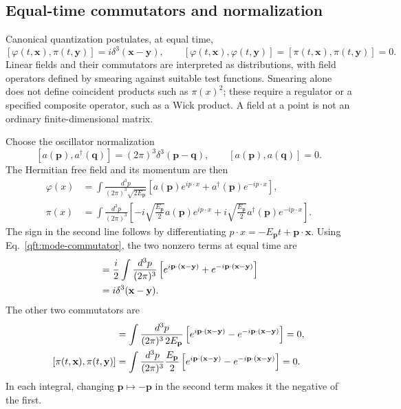 \subsection{Equal-time commutators and normalization}
Canonical quantization postulates, at equal time,
\begin{equation}\label{qft:canonical-commutators}
 [\varphi(t,\mathbf x),\pi(t,\mathbf y)]
 =i\delta^3(\mathbf x-\mathbf y),\qquad
 [\varphi(t,\mathbf x),\varphi(t,\mathbf y)]
 =[\pi(t,\mathbf x),\pi(t,\mathbf y)]=0.
\end{equation}
Linear fields and their commutators are interpreted as distributions,
with field operators defined by smearing against suitable test functions.
Smearing alone does not define coincident products such as $\pi(x)^2$;
these require a regulator or a specified composite operator, such as a Wick
product. A field at a point is not an ordinary finite-dimensional matrix.

Choose the oscillator normalization
\begin{equation}\label{qft:mode-commutator}
 [a(\mathbf p),a^\dagger(\mathbf q)]
 =(2\pi)^3\delta^3(\mathbf p-\mathbf q),\qquad
 [a(\mathbf p),a(\mathbf q)]=0.
\end{equation}
The Hermitian free field and its momentum are then
\begin{align}
 \varphi(x)
 &=\int\frac{d^3p}{(2\pi)^3\sqrt{2E_{\mathbf p}}}
 \left[a(\mathbf p)e^{ip\cdot x}
       +a^\dagger(\mathbf p)e^{-ip\cdot x}\right],
 \label{qft:field-modes}\\
 \pi(x)
 &=\int\frac{d^3p}{(2\pi)^3}
 \left[-i\sqrt{\frac{E_{\mathbf p}}2}a(\mathbf p)e^{ip\cdot x}
       +i\sqrt{\frac{E_{\mathbf p}}2}a^\dagger(\mathbf p)e^{-ip\cdot x}\right].
 \label{qft:momentum-modes}
\end{align}
The sign in the second line follows by differentiating
$p\cdot x=-E_{\mathbf p}t+\mathbf p\cdot\mathbf x$.
Using Eq.~\eqref{qft:mode-commutator}, the two nonzero terms at equal time
are
\begin{align}
 [\varphi(t,\mathbf x),\pi(t,\mathbf y)]
 &=\frac i2\int\frac{d^3p}{(2\pi)^3}
 \left[e^{i\mathbf p\cdot(\mathbf x-\mathbf y)}
       +e^{-i\mathbf p\cdot(\mathbf x-\mathbf y)}\right]\notag\\
 &=i\delta^3(\mathbf x-\mathbf y).
 \label{qft:mode-normalization-check}
\end{align}
The other two commutators are
\begin{align}
 [\varphi(t,\mathbf x),\varphi(t,\mathbf y)]
 &=\int\frac{d^3p}{(2\pi)^3\,2E_{\mathbf p}}
 \left[e^{i\mathbf p\cdot(\mathbf x-\mathbf y)}
       -e^{-i\mathbf p\cdot(\mathbf x-\mathbf y)}\right]=0,\notag\\
 [\pi(t,\mathbf x),\pi(t,\mathbf y)]
 &=\int\frac{d^3p}{(2\pi)^3}\frac{E_{\mathbf p}}2
 \left[e^{i\mathbf p\cdot(\mathbf x-\mathbf y)}
       -e^{-i\mathbf p\cdot(\mathbf x-\mathbf y)}\right]=0.
 \label{qft:equal-time-zero}
\end{align}
In each integral, changing $\mathbf p\mapsto-\mathbf p$ in the second
term makes it the negative of the first.

